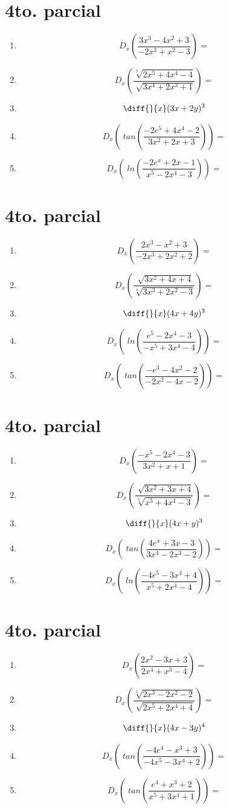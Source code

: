 \documentclass[oneside,spanish,letter]{article}
\begin{document}
\section{4to. parcial}
\begin{enumerate}
 \item $$ D_x \left( \frac{3x^3-4x^2+3}{-2x^3+x^2-3}\right)=$$
 \item $$ D_x \left( \frac{\sqrt[5]{2x^5+4x^4-4}}{\sqrt[]{3x^4+2x^3+1}}\right)=$$
\item $$\diff{}{x}(3x+2y)^3$$
 \item $$ D_x \left(\;tan\left( \frac{-2e^5+4x^4-2}{3x^2+2x+3}\right)\right)=$$
 \item $$ D_x \left(\;ln\left( \frac{-2e^x+2x-1}{x^5-2x^4-3}\right)\right)=$$
 \end{enumerate}
  \newpage
\section{4to. parcial}
\begin{enumerate}
 \item $$ D_x \left( \frac{2x^3-x^2+3}{-2x^3+2x^2+2}\right)=$$
 \item $$ D_x \left( \frac{\sqrt[]{3x^2+4x+4}}{\sqrt[4]{3x^3+2x^2-3}}\right)=$$
\item $$\diff{}{x}(4x+4y)^3$$
 \item $$ D_x \left(\;ln\left( \frac{e^5-2x^4-3}{-x^5+3x^4-4}\right)\right)=$$
 \item $$ D_x \left(\;tan\left( \frac{-e^3-4x^2-2}{-2x^2-4x-2}\right)\right)=$$
 \end{enumerate}
  \newpage
\section{4to. parcial}
\begin{enumerate}
 \item $$ D_x \left( \frac{-x^5-2x^4-3}{3x^2+x+1}\right)=$$
 \item $$ D_x \left( \frac{\sqrt[]{3x^2+3x+4}}{\sqrt[5]{x^5+4x^4-3}}\right)=$$
\item $$\diff{}{x}(4x+y)^3$$
 \item $$ D_x \left(\;tan\left( \frac{4e^x+3x-3}{3x^4-2x^3-2}\right)\right)=$$
 \item $$ D_x \left(\;ln\left( \frac{-4e^5-3x^4+4}{x^5+2x^4-4}\right)\right)=$$
 \end{enumerate}
  \newpage
\section{4to. parcial}
\begin{enumerate}
 \item $$ D_x \left( \frac{2x^2-3x+3}{2x^4+x^3-4}\right)=$$
 \item $$ D_x \left( \frac{\sqrt[5]{2x^3-2x^2-2}}{\sqrt[]{2x^5+2x^4+4}}\right)=$$
\item $$\diff{}{x}(4x-3y)^4$$
 \item $$ D_x \left(\;tan\left( \frac{-4e^4-x^3+3}{-4x^5-3x^4+2}\right)\right)=$$
 \item $$ D_x \left(\;tan\left( \frac{e^4+x^3+2}{x^5+3x^4+1}\right)\right)=$$
 \end{enumerate}
  \newpage
\end{document}
